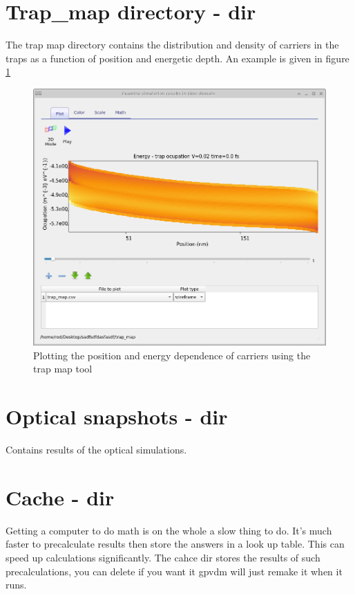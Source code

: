 \section{Trap\_map directory - dir}
The trap map directory contains the distribution and density of carriers in the traps as a function of position and energetic depth. An example is given in figure \ref{fig:trapmap}
\label{sec:trapmap}


\begin{figure}[H]
\centering
\includegraphics[width=\textwidth,height=0.7\textwidth]{./images/trapmap.png}
\caption{Plotting the position and energy dependence of carriers using the trap map tool}
\label{fig:trapmap}
\end{figure}

\section{Optical snapshots - dir}
\label{sec:snapshotsoptical}
Contains results of the optical simulations.

\section{Cache - dir}
\label{sec:cache}
Getting a computer to do math is on the whole a slow thing to do. It's much faster to precalculate results then store the answers in a look up table.  This can speed up calculations significantly.  The cahce dir stores the results of such precalculations, you can delete if you want it gpvdm will just remake it when it runs.

